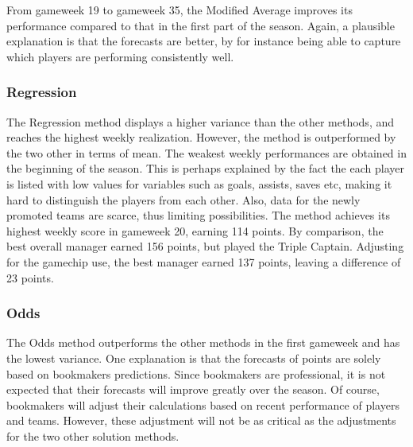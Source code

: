 \newpar

From gameweek 19 to gameweek 35, the Modified Average improves its performance compared to that in the first part of the season. Again, a plausible explanation is that the forecasts are better, by for instance being able to capture which players are performing consistently well.


\subsubsection{Regression}

The Regression method displays a higher variance than the other methods, and reaches the highest weekly realization. However, the method is outperformed by the two other in terms of mean. The weakest weekly performances are obtained in the beginning of the season. This is perhaps explained by the fact the each player is listed with low values for variables such as goals, assists, saves etc, making it hard to distinguish the players from each other. Also, data for the newly promoted teams are scarce, thus limiting possibilities. The method achieves its highest weekly score in gameweek 20, earning 114 points. By comparison, the best overall manager earned 156 points, but played the Triple Captain. Adjusting for the gamechip use, the best manager earned 137 points, leaving a difference of 23 points.

\subsubsection{Odds}

\newpar

The Odds method outperforms the other methods in the first gameweek and has the lowest variance. One explanation is that the forecasts of points are solely based on bookmakers predictions. Since bookmakers are professional, it is not expected that their forecasts will improve greatly over the season. Of course, bookmakers will adjust their calculations based on recent performance of players and teams. However, these adjustment will not be as critical as the adjustments for the two other solution methods. 

